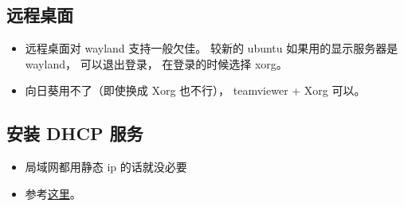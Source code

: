 \subsection{远程桌面}
\begin{itemize}
\item 远程桌面对 wayland 支持一般欠佳。 较新的 ubuntu 如果用的显示服务器是 wayland， 可以退出登录， 在登录的时候选择 xorg。
\item 向日葵用不了（即使换成 Xorg 也不行）， teamviewer + Xorg 可以。
\end{itemize}

\subsection{安装 DHCP 服务}
\begin{itemize}
\item 局域网都用静态 ip 的话就没必要
\item 参考\href{https://www.linuxtechi.com/how-to-configure-dhcp-server-on-ubuntu/}{这里}。
\end{itemize}
